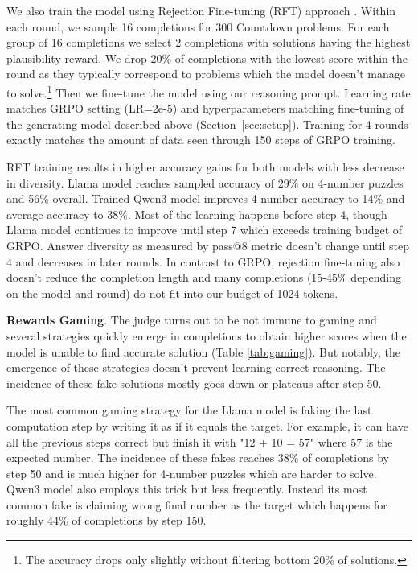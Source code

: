 \documentclass[12pt,a4paper]{article}
\begin{document}
We also train the model using Rejection Fine-tuning (RFT) approach \citep{yuan_scaling_2023}. Within each round, we sample 16 completions for 300 Countdown problems. For each group of 16 completions we select 2 completions with solutions having the highest plausibility reward. We drop 20\% of completions with the lowest score within the round as they typically correspond to problems which the model doesn't manage to solve.\footnote{The accuracy drops only slightly without filtering bottom 20\% of solutions.} Then we fine-tune the model using our reasoning prompt. Learning rate matches GRPO setting  (LR=2e-5) and hyperparameters matching fine-tuning of the generating model described above (Section~\ref{sec:setup}). Training for 4 rounds exactly matches the amount of data seen through 150 steps of GRPO training.

RFT training results in higher accuracy gains for both models with less decrease in diversity. Llama model reaches sampled accuracy of 29\% on 4-number puzzles and 56\% overall. Trained Qwen3 model improves 4-number accuracy to 14\% and average accuracy to 38\%. Most of the learning happens before step 4, though Llama model continues to improve until step 7 which exceeds training budget of GRPO. Answer diversity as measured by pass@8 metric doesn't change until step 4 and decreases in later rounds. In contrast to GRPO, rejection fine-tuning also doesn't reduce the completion length and many completions (15-45\% depending on the model and round) do not fit into our budget of 1024 tokens. 



\textbf{Rewards Gaming}. The judge turns out to be not immune to gaming and several strategies quickly emerge in completions to obtain higher scores when the model is unable to find accurate solution (Table \ref{tab:gaming}). But notably, the emergence of these strategies doesn't prevent learning correct reasoning. The incidence of these fake solutions mostly goes down or plateaus after step 50.

The most common gaming strategy for the Llama model is faking the last computation step by writing it as if it equals the target. For example, it can have all the previous steps correct but finish it with "12 + 10 = 57" where 57 is the expected number. The incidence of these fakes reaches 38\% of completions by step 50 and is much higher for 4-number puzzles which are harder to solve. Qwen3 model also employs this trick but less frequently. Instead its most common fake is claiming wrong final number as the target which happens for roughly 44\% of completions by step 150. 
\end{document}

